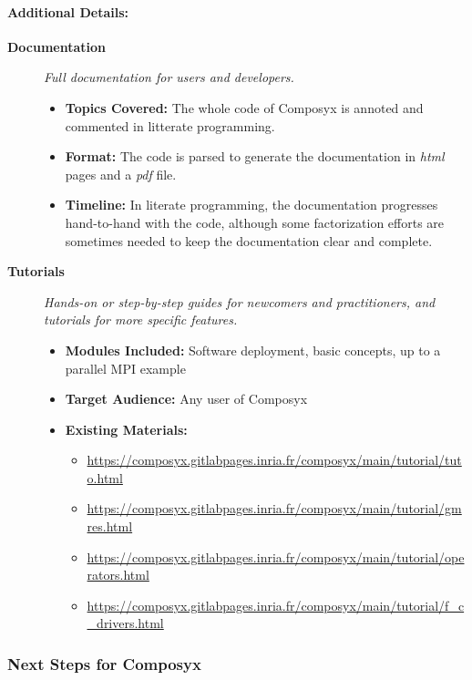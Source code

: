\paragraph{Additional Details:}
\begin{description}
\item[\textbf{Documentation}] %
\emph{Full documentation for users and developers.}

\begin{itemize}
\item \textbf{Topics Covered:} The whole code of Composyx is annoted
  and commented in litterate programming.
  \item \textbf{Format:} The code is parsed to generate the documentation in \textit{html} pages and a \textit{pdf} file.
  \item \textbf{Timeline:} In literate programming, the documentation
    progresses hand-to-hand with the code, although some factorization
    efforts are sometimes needed to keep the documentation clear and
    complete.
\end{itemize}

\item[\textbf{Tutorials}] %
\emph{Hands-on or step-by-step guides for newcomers and practitioners, and tutorials for more specific features.}

\begin{itemize}
\item \textbf{Modules Included:} Software deployment, basic concepts, up to a parallel MPI example
\item \textbf{Target Audience:} Any user of Composyx
\item \textbf{Existing Materials:} \begin{itemize}
  \item \url{https://composyx.gitlabpages.inria.fr/composyx/main/tutorial/tuto.html}
  \item \url{https://composyx.gitlabpages.inria.fr/composyx/main/tutorial/gmres.html}
  \item \url{https://composyx.gitlabpages.inria.fr/composyx/main/tutorial/operators.html}
  \item \url{https://composyx.gitlabpages.inria.fr/composyx/main/tutorial/f_c_drivers.html}
  \end{itemize}
\end{itemize}

\end{description}

\subsubsection{Next Steps for Composyx}
\label{sec:Composyx:next-steps}

